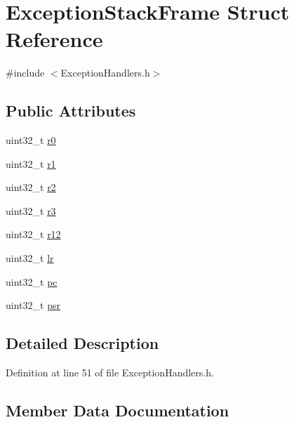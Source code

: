 \hypertarget{struct_exception_stack_frame}{}\section{Exception\+Stack\+Frame Struct Reference}
\label{struct_exception_stack_frame}


{\ttfamily \#include $<$Exception\+Handlers.\+h$>$}

\subsection*{Public Attributes}
\begin{DoxyCompactItemize}
\item 
uint32\+\_\+t \hyperlink{struct_exception_stack_frame_a438f9e853effc38bca162f3821fd176a}{r0}
\item 
uint32\+\_\+t \hyperlink{struct_exception_stack_frame_a4ca6f1d249bae98cc5fd549defd36740}{r1}
\item 
uint32\+\_\+t \hyperlink{struct_exception_stack_frame_a21bcab1471ce8d7389f81bbc7fb5bbc6}{r2}
\item 
uint32\+\_\+t \hyperlink{struct_exception_stack_frame_a980339f7a21c9b31de49da6b37c80c91}{r3}
\item 
uint32\+\_\+t \hyperlink{struct_exception_stack_frame_ae10879ca5d9e29cb102fdd287a6a6fdc}{r12}
\item 
uint32\+\_\+t \hyperlink{struct_exception_stack_frame_ae13697c9730196bc978ef10e854d8616}{lr}
\item 
uint32\+\_\+t \hyperlink{struct_exception_stack_frame_a9ca9dbdac9c690f2ec2736d59adc9325}{pc}
\item 
uint32\+\_\+t \hyperlink{struct_exception_stack_frame_a3b22a932476d94a66740439f456c5a0b}{psr}
\end{DoxyCompactItemize}


\subsection{Detailed Description}


Definition at line 51 of file Exception\+Handlers.\+h.



\subsection{Member Data Documentation}
\mbox{\label{struct_exception_stack_frame_ae13697c9730196bc978ef10e854d8616}} 
